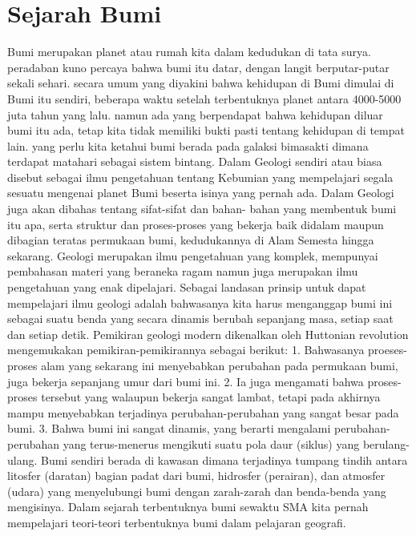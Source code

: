 
\section{Sejarah Bumi}
Bumi merupakan planet atau rumah kita dalam kedudukan di tata surya. peradaban kuno percaya bahwa bumi itu datar, dengan langit berputar-putar sekali sehari. secara umum yang diyakini bahwa kehidupan di Bumi dimulai di Bumi itu sendiri, beberapa waktu setelah terbentuknya planet antara 4000-5000 juta tahun yang lalu. namun ada yang berpendapat bahwa kehidupan diluar bumi itu ada, tetap kita tidak memiliki bukti pasti tentang kehidupan di tempat lain. yang perlu kita ketahui bumi berada pada galaksi bimasakti dimana terdapat matahari sebagai sistem bintang.
Dalam Geologi sendiri atau biasa disebut sebagai ilmu pengetahuan tentang Kebumian yang mempelajari segala sesuatu mengenai planet Bumi beserta isinya yang pernah ada. Dalam Geologi juga akan dibahas tentang sifat-sifat dan bahan- bahan yang membentuk bumi itu apa, serta struktur dan proses-proses yang bekerja baik didalam maupun dibagian teratas permukaan bumi, kedudukannya di Alam Semesta hingga sekarang. Geologi merupakan ilmu pengetahuan yang komplek, mempunyai pembahasan materi yang beraneka ragam namun juga merupakan ilmu pengetahuan yang enak dipelajari. Sebagai landasan prinsip untuk dapat mempelajari ilmu geologi adalah bahwasanya kita harus menganggap bumi ini sebagai suatu benda yang secara dinamis berubah sepanjang masa, setiap saat dan setiap detik. 
Pemikiran geologi modern dikenalkan oleh Huttonian revolution mengemukakan pemikiran-pemikirannya sebagai berikut:
1. Bahwasanya proeses-proses alam yang sekarang ini menyebabkan perubahan pada permukaan bumi, juga bekerja sepanjang umur dari bumi ini. 
2. Ia juga mengamati bahwa proses-proses tersebut yang walaupun bekerja sangat lambat, tetapi pada akhirnya mampu menyebabkan terjadinya perubahan-perubahan yang sangat besar pada bumi. 
3. Bahwa bumi ini sangat dinamis, yang berarti mengalami perubahan-perubahan yang terus-menerus mengikuti suatu pola daur (siklus) yang berulang-ulang.
Bumi sendiri berada di kawasan dimana terjadinya tumpang tindih antara litosfer (daratan) bagian padat dari bumi, hidrosfer (perairan), dan atmosfer (udara) yang menyelubungi bumi dengan zarah-zarah dan benda-benda yang mengisinya.
Dalam sejarah terbentuknya bumi sewaktu SMA kita pernah mempelajari teori-teori terbentuknya bumi dalam pelajaran geografi.\cite{wetherill1990formation}

